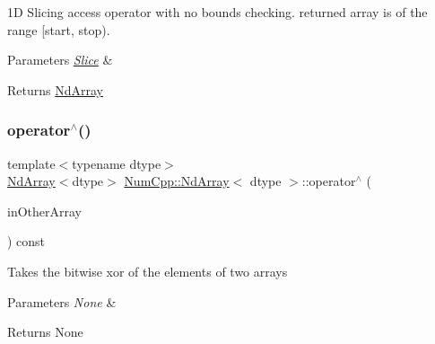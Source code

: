 1D Slicing access operator with no bounds checking. returned array is of the range \mbox{[}start, stop).


\begin{DoxyParams}{Parameters}
{\em \mbox{\hyperlink{class_num_cpp_1_1_slice}{Slice}}} & \\
\hline
\end{DoxyParams}
\begin{DoxyReturn}{Returns}
\mbox{\hyperlink{class_num_cpp_1_1_nd_array}{Nd\+Array}} 
\end{DoxyReturn}
\mbox{\label{class_num_cpp_1_1_nd_array_ac673513782efac273bad25654c462205}} 
\subsubsection{\texorpdfstring{operator$^\wedge$()}{operator^()}\hspace{0.1cm}{\footnotesize\ttfamily [1/2]}}
{\footnotesize\ttfamily template$<$typename dtype$>$ \\
\mbox{\hyperlink{class_num_cpp_1_1_nd_array}{Nd\+Array}}$<$dtype$>$ \mbox{\hyperlink{class_num_cpp_1_1_nd_array}{Num\+Cpp\+::\+Nd\+Array}}$<$ dtype $>$\+::operator$^\wedge$ (\begin{DoxyParamCaption}\item[{const \mbox{\hyperlink{class_num_cpp_1_1_nd_array}{Nd\+Array}}$<$ dtype $>$ \&}]{in\+Other\+Array }\end{DoxyParamCaption}) const\hspace{0.3cm}{\ttfamily [inline]}}

Takes the bitwise xor of the elements of two arrays


\begin{DoxyParams}{Parameters}
{\em None} & \\
\hline
\end{DoxyParams}
\begin{DoxyReturn}{Returns}
None 
\end{DoxyReturn}
\mbox{\label{class_num_cpp_1_1_nd_array_ae6d8d3e0dba5d6bbfa95a1e1f659005f}} 
